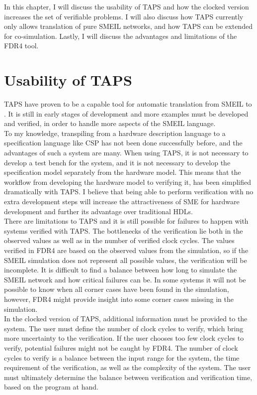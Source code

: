 In this chapter, I will discuss the usability of TAPS and how the clocked version increases the set of verifiable problems. I will also discuss how TAPS currently only allows translation of pure SMEIL networks, and how TAPS can be extended for co-simulation. Lastly, I will discuss the advantages and limitations of the FDR4 tool.
\section{Usability of TAPS}
TAPS have proven to be a capable tool for automatic translation from SMEIL to \cspm{}. It is still in early stages of development and more examples must be developed and verified, in order to handle more aspects of the SMEIL language.\\

To my knowledge, transpiling from a hardware description language to a specification language like CSP has not been done successfully before, and the advantages of such a system are many. When using TAPS, it is not necessary to develop a test bench for the system, and it is not necessary to develop the specification model separately from the hardware model. This means that the workflow from developing the hardware model to verifying it, has been simplified dramatically with TAPS. I believe that being able to perform verification with no extra development steps will increase the attractiveness of SME for hardware development and further its advantage over traditional HDLs.\\

There are limitations to TAPS and it is still possible for failures to happen with systems verified with TAPS. The bottlenecks of the verification lie both in the observed values as well as in the number of verified clock cycles.
The values verified in FDR4 are based on the observed values from the simulation, so if the SMEIL simulation does not represent all possible values, the verification will be incomplete.
It is difficult to find a balance between how long to simulate the SMEIL network and how critical failures can be. In some systems it will not be possible to know when all corner cases have been found in the simulation, however, FDR4 might provide insight into some corner cases missing in the simulation.\\

In the clocked version of TAPS, additional information must be provided to the system. The user must define the number of clock cycles to verify, which bring more uncertainty to the verification. If the user chooses too few clock cycles to verify, potential failures might not be caught by FDR4. The number of clock cycles to verify is a balance between the input range for the system, the time requirement of the verification, as well as the complexity of the system.
The user must ultimately determine the balance between verification and verification time, based on the program at hand. \\

